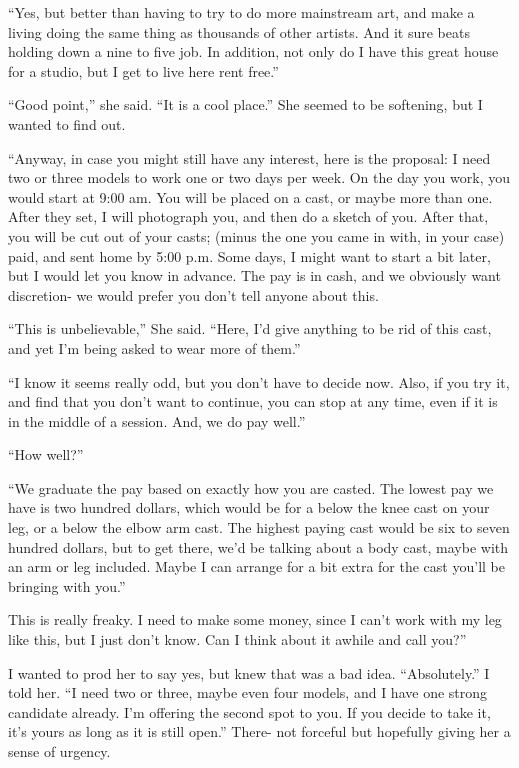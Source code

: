 ``Yes, but better than having to try to do more mainstream art, and make a living doing the
same thing as thousands of other artists. And it sure beats holding down a nine to five job. In
addition, not only do I have this great house for a studio, but I get to live here rent free.''

``Good point,'' she said. ``It is a cool place.'' She seemed to be softening, but I wanted
to find out.

``Anyway, in case you might still have any interest, here is the proposal: I need two or
three models to work one or two days per week. On the day you work, you would start at 9:00 am.
You will be placed on a cast, or maybe more than one. After they set, I will photograph you, and
then do a sketch of you. After that, you will be cut out of your casts; (minus the one you came
in with, in your case) paid, and sent home by 5:00 p.m. Some days, I might want to start a bit
later, but I would let you know in advance. The pay is in cash, and we obviously want
discretion- we would prefer you don't tell anyone about this.

``This is unbelievable,'' She said. ``Here, I'd give anything to be rid of this cast, and
yet I'm being asked to wear more of them.''

``I know it seems really odd, but you don't have to decide now. Also, if you try it, and
find that you don't want to continue, you can stop at any time, even if it is in the middle of a
session. And, we do pay well.''

``How well?''

``We graduate the pay based on exactly how you are casted. The lowest pay we have is two
hundred dollars, which would be for a below the knee cast on your leg, or a below the elbow arm
cast. The highest paying cast would be six to seven hundred dollars, but to get there, we'd be
talking about a body cast, maybe with an arm or leg included. Maybe I can arrange for a bit
extra for the cast you'll be bringing with you.''

This is really freaky. I need to make some money, since I can't work with my leg like this,
but I just don't know. Can I think about it awhile and call you?''

I wanted to prod her to say yes, but knew that was a bad idea. ``Absolutely.'' I told her.
``I need two or three, maybe even four models, and I have one strong candidate already. I'm
offering the second spot to you. If you decide to take it, it's yours as long as it is still
open.'' There- not forceful but hopefully giving her a sense of urgency.


